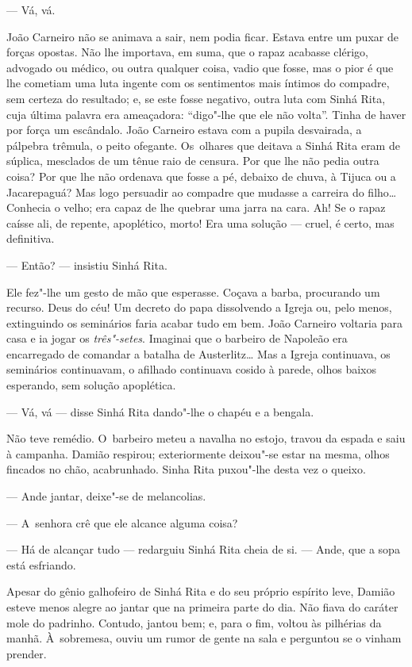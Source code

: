 \begin{linenumbers}
--- Vá, vá.

João Carneiro não se animava a sair, nem podia ficar. Estava entre um
puxar de forças opostas. Não lhe importava, em suma, que o rapaz
acabasse clérigo, advogado ou médico, ou outra qualquer coisa, vadio que
fosse, mas o pior é que lhe cometiam uma luta ingente com os sentimentos
mais íntimos do compadre, sem certeza do resultado; e, se este fosse
negativo, outra luta com Sinhá Rita, cuja última palavra era ameaçadora:
``digo"-lhe que ele não volta''. Tinha de haver por força um escândalo.
João Carneiro estava com a pupila desvairada, a pálpebra trêmula, o
peito ofegante. Os~olhares que deitava a Sinhá Rita eram de súplica,
mesclados de um tênue raio de censura. Por que lhe não pedia outra
coisa? Por que lhe não ordenava que fosse a pé, debaixo de chuva, à
Tijuca ou a Jacarepaguá? Mas logo persuadir ao compadre que mudasse a
carreira do filho\ldots{} Conhecia o velho; era capaz de lhe quebrar uma
jarra na cara. Ah! Se o rapaz caísse ali, de repente, apoplético, morto!
Era uma solução --- cruel, é certo, mas definitiva.

--- Então? --- insistiu Sinhá Rita.

Ele fez"-lhe um gesto de mão que esperasse. Coçava a barba, procurando um
recurso. Deus do céu! Um decreto do papa dissolvendo a Igreja ou, pelo
menos, extinguindo os seminários faria acabar tudo em bem. João Carneiro
voltaria para casa e ia jogar os \emph{três"-setes}. Imaginai que o
barbeiro de Napoleão era encarregado de comandar a batalha de
Austerlitz\ldots{} Mas a Igreja continuava, os seminários continuavam, o
afilhado continuava cosido à parede, olhos baixos esperando, sem solução
apoplética.

--- Vá, vá --- disse Sinhá Rita dando"-lhe o chapéu e a bengala.

Não teve remédio. O~barbeiro meteu a navalha no estojo, travou da espada
e saiu à campanha. Damião respirou; exteriormente deixou"-se estar na
mesma, olhos fincados no chão, acabrunhado. Sinha Rita puxou"-lhe desta
vez o queixo.

--- Ande jantar, deixe"-se de melancolias.

--- A~senhora crê que ele alcance alguma coisa?

--- Há de alcançar tudo --- redarguiu Sinhá Rita cheia de si. --- Ande, que
a sopa está esfriando.

Apesar do gênio galhofeiro de Sinhá Rita e do seu próprio espírito leve,
Damião esteve menos alegre ao jantar que na primeira parte do dia. Não
fiava do caráter mole do padrinho. Contudo, jantou bem; e, para o fim,
voltou às pilhérias da manhã. À~sobremesa, ouviu um rumor de gente na
sala e perguntou se o vinham prender.


\end{linenumbers}
